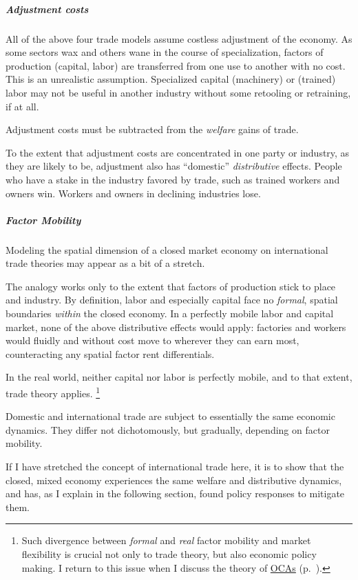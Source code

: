\subparagraph{Adjustment costs}
	\label{sec:adjustment-costs}
All of the above four trade models assume costless adjustment of the economy.
As some sectors wax and others wane in the course of specialization, factors of production (capital, labor) are transferred from one use to another with no cost.
This is an unrealistic assumption.
Specialized capital (machinery) or (trained) labor may not be useful in another industry without some retooling or retraining, if at all.

Adjustment costs must be subtracted from the \emph{welfare} gains of trade.

To the extent that adjustment costs are concentrated in one party or industry, as they are likely to be, adjustment also has ``domestic'' \emph{distributive} effects.
People who have a stake in the industry favored by trade, such as trained workers and owners win.
Workers and owners in declining industries lose.

\subparagraph{Factor Mobility}
	\label{sec:factor-mobility-trade}
Modeling the spatial dimension of a closed market economy on international trade theories may appear as a bit of a stretch.

The analogy works only to the extent that factors of production stick to place and industry.
By definition, labor and especially capital face no \emph{formal}, spatial boundaries \emph{within} the closed economy.
In a perfectly mobile labor and capital market, none of the above distributive effects would apply:
factories and workers would fluidly and without cost move to wherever they can earn most, counteracting any spatial factor rent differentials.

In the real world, neither capital nor labor is perfectly mobile, and to that extent, trade theory applies.
\footnote{
	Such divergence between \emph{formal} and \emph{real} factor mobility and market flexibility is crucial not only to trade theory, but also economic policy making.
	I return to this issue when I discuss the theory of \hyperref[sec:OCA]{\glspl{OCA}} (p.~\pageref{sec:OCA}).
}

Domestic and international trade are subject to essentially the same economic dynamics.
They differ not dichotomously, but gradually, depending on factor mobility.

If I have stretched the concept of international trade here, it is to show that the closed, mixed economy experiences the same welfare and distributive dynamics, and has, as I explain in the following section, found policy responses to mitigate them.

